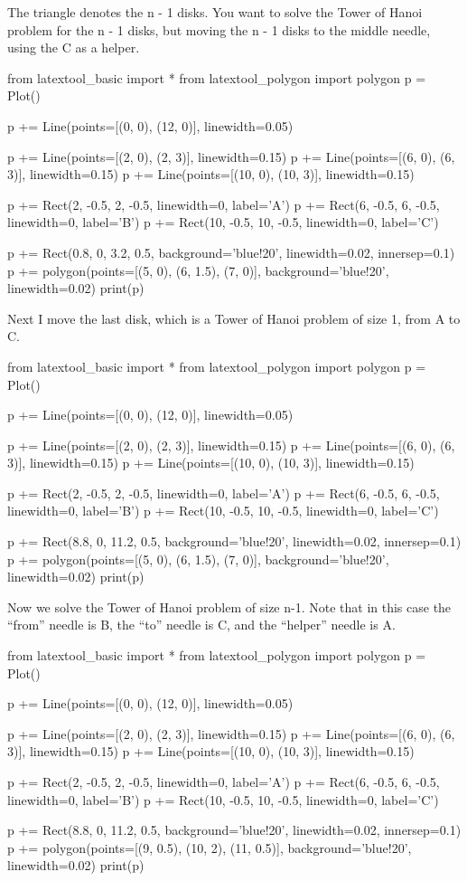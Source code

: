  The triangle denotes the n - 1 disks. You want to solve the Tower
 of Hanoi problem for the n - 1 disks, but moving the n - 1 disks to
 the middle needle, using the C as a helper.

\begin{python}
from latextool_basic import *
from latextool_polygon import polygon
p = Plot()

p += Line(points=[(0, 0), (12, 0)], linewidth=0.05)

p += Line(points=[(2, 0), (2, 3)], linewidth=0.15)
p += Line(points=[(6, 0), (6, 3)], linewidth=0.15)
p += Line(points=[(10, 0), (10, 3)], linewidth=0.15)

p += Rect(2, -0.5, 2, -0.5, linewidth=0, label='A')
p += Rect(6, -0.5, 6, -0.5, linewidth=0, label='B')
p += Rect(10, -0.5, 10, -0.5, linewidth=0, label='C')

p += Rect(0.8, 0, 3.2, 0.5, background='blue!20', linewidth=0.02, innersep=0.1)  
p += polygon(points=[(5, 0), (6, 1.5), (7, 0)], background='blue!20', linewidth=0.02)
print(p)
\end{python}

 Next I move the last disk, which is a Tower of Hanoi problem of size 1,
 from A to C.

\begin{python}
from latextool_basic import *
from latextool_polygon import polygon
p = Plot()

p += Line(points=[(0, 0), (12, 0)], linewidth=0.05)

p += Line(points=[(2, 0), (2, 3)], linewidth=0.15)
p += Line(points=[(6, 0), (6, 3)], linewidth=0.15)
p += Line(points=[(10, 0), (10, 3)], linewidth=0.15)

p += Rect(2, -0.5, 2, -0.5, linewidth=0, label='A')
p += Rect(6, -0.5, 6, -0.5, linewidth=0, label='B')
p += Rect(10, -0.5, 10, -0.5, linewidth=0, label='C')

p += Rect(8.8, 0, 11.2, 0.5, background='blue!20', linewidth=0.02, innersep=0.1)  
p += polygon(points=[(5, 0), (6, 1.5), (7, 0)], background='blue!20', linewidth=0.02)
print(p)
\end{python}

 Now we solve the Tower of Hanoi problem of size n-1. Note that in this
 case the ``from'' needle is B, the ``to'' needle is C, and the
 ``helper'' needle is A.

\begin{python}
from latextool_basic import *
from latextool_polygon import polygon
p = Plot()

p += Line(points=[(0, 0), (12, 0)], linewidth=0.05)

p += Line(points=[(2, 0), (2, 3)], linewidth=0.15)
p += Line(points=[(6, 0), (6, 3)], linewidth=0.15)
p += Line(points=[(10, 0), (10, 3)], linewidth=0.15)

p += Rect(2, -0.5, 2, -0.5, linewidth=0, label='A')
p += Rect(6, -0.5, 6, -0.5, linewidth=0, label='B')
p += Rect(10, -0.5, 10, -0.5, linewidth=0, label='C')

p += Rect(8.8, 0, 11.2, 0.5, background='blue!20', linewidth=0.02, innersep=0.1)  
p += polygon(points=[(9, 0.5), (10, 2), (11, 0.5)], background='blue!20', linewidth=0.02)
print(p)
\end{python}

